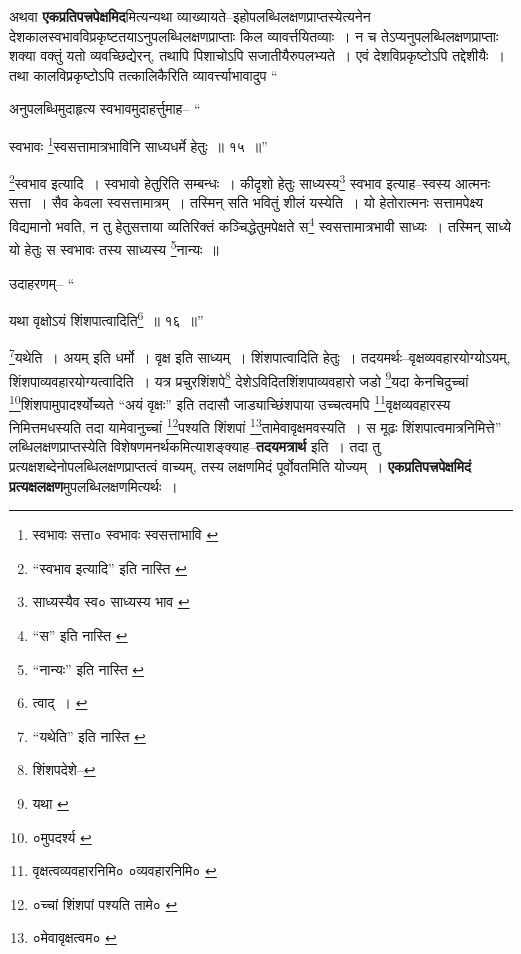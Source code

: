 \documentclass[article,12pt,a4paper]{memoir}
\begin{document}
	  \pstart अथवा \textbf{एकप्रतिपत्त्रपेक्षमिद}मित्यन्यथा व्याख्यायते--इहोपलब्धिलक्षणप्राप्तस्येत्यनेन देशकालस्वभावविप्रकृष्टतयाऽनुपलब्धिलक्षणप्राप्ताः किल व्यावर्त्तयितव्याः । न च तेऽप्यनुपलब्धिलक्षणप्राप्ताः शक्या वक्तुं यतो व्यवच्छिद्येरन्, तथापि पिशाचोऽपि सजातीयैरुपलभ्यते । एवं देशविप्रकृष्टोऽपि तद्देशीयैः । तथा कालविप्रकृष्टोऽपि तत्कालिकैरिति व्यावर्त्त्याभावादुप \leavevmode{} “
	  
	अनुपलब्धिमुदाहृत्य स्वभावमुदाहर्त्तुमाह-- “
	  
	स्वभावः \footnote{स्वभावः सत्ता० \cite{dp-msC} स्वभावः स्वसत्ताभावि \cite{dp-edE}}स्वसत्तामात्रभाविनि साध्यधर्मे हेतुः ॥ १५ ॥” 
	  
	\footnote{“स्वभाव इत्यादि” इति नास्ति \cite{dp-msA} \cite{dp-edP} \cite{dp-edH} \cite{dp-edE} \cite{dp-edN}}स्वभाव इत्यादि । स्वभावो हेतुरिति सम्बन्धः । कीदृशो हेतुः साध्यस्य\footnote{साध्यस्यैव स्व० \cite{dp-msA} \cite{dp-edP} \cite{dp-edH} \cite{dp-edE} \cite{dp-edN} साध्यस्य भाव \cite{dp-msB}} स्वभाव इत्याह--स्वस्य आत्मनः सत्ता । सैव केवला स्वसत्तामात्रम् । तस्मिन् सति भवितुं शीलं यस्येति । यो हेतोरात्मनः सत्तामपेक्ष्य विद्यमानो भवति, न तु हेतुसत्ताया व्यतिरिक्तं कञ्चिद्धेतुमपेक्षते स\footnote{“स” इति नास्ति \cite{dp-msA}} स्वसत्तामात्रभावी साध्यः । तस्मिन् साध्ये यो हेतुः स स्वभावः तस्य साध्यस्य \footnote{“नान्यः” इति नास्ति \cite{dp-msC}}नान्यः ॥ 
	  
	उदाहरणम्-- “
	  
	यथा वृक्षोऽयं शिंशपात्वादिति\footnote{त्वाद् । \cite{dp-msC}} ॥ १६ ॥” 
	  
	\footnote{“यथेति” इति नास्ति \cite{dp-edH} \cite{dp-edE} \cite{dp-edN}}यथेति । अयम् इति धर्मो । वृक्ष इति साध्यम् । शिंशपात्वादिति हेतुः । तदयमर्थः--वृक्षव्यवहारयोग्योऽयम्, शिंशपाव्यवहारयोग्यत्वादिति । यत्र प्रचुरशिंशपे\footnote{शिंशपदेशे--\cite{dp-msC}} देशेऽविदितशिंशपाव्यवहारो जडो \footnote{यथा \cite{dp-msB}}यदा केनचिदुच्चां \footnote{०मुपदर्श्य \cite{dp-msB}}शिंशपामुपादर्श्योच्यते “अयं वृक्षः” इति तदासौ जाड्याच्छिंशपाया उच्चत्वमपि \footnote{वृक्षत्वव्यवहारनिमि० \cite{dp-msC} ०व्यवहारनिमि० \cite{dp-msA} \cite{dp-edP} \cite{dp-edE} \cite{dp-edH} \cite{dp-edN}}वृक्षव्यवहारस्य निमित्तमधस्यति तदा यामेवानुच्चां \footnote{०च्चां शिंशपां पश्यति तामे० \cite{dp-msA} \cite{dp-edP} \cite{dp-edH} \cite{dp-edE} \cite{dp-edN}}पश्यति शिंशपां \footnote{०मेवावृक्षत्वम० \cite{dp-msA}}तामेवावृक्षमवस्यति । स मूढः शिंशपात्वमात्रनिमित्ते” लब्धिलक्षणप्राप्तस्येति विशेषणमनर्थकमित्याशङ्क्याह--\textbf{तदयमत्रार्थ} इति । तदा तु प्रत्यक्षशब्देनोपलब्धिलक्षणप्राप्तत्वं वाच्यम्, तस्य लक्षणमिदं पूर्वोवतमिति योज्यम् । \textbf{एकप्रतिपत्त्रपेक्षमिदं प्रत्यक्षलक्षण}मुपलब्धिलक्षणमित्यर्थः ।
	\pend
      
\end{document}
